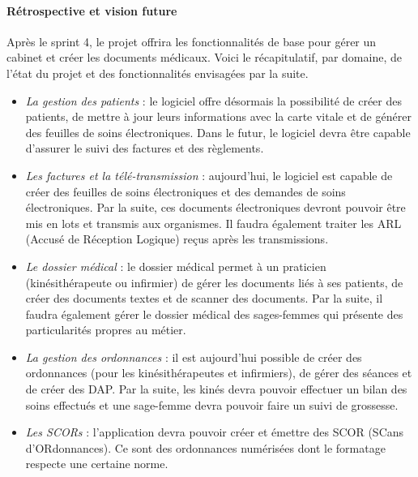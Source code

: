 \paragraph*{Rétrospective et vision future\\}
Après le sprint 4, le projet offrira les fonctionnalités de base pour gérer un cabinet et créer les documents médicaux.
Voici le récapitulatif, par domaine, de l'état du projet et des fonctionnalités envisagées par la suite.
\begin{itemize}
	\item \textit{La gestion des patients} : le logiciel offre désormais la possibilité de créer des patients, de mettre à jour leurs informations avec la carte vitale et de générer des feuilles de soins électroniques.
	Dans le futur, le logiciel devra être capable d'assurer le suivi des factures et des règlements.
	
	\item \textit{Les factures et la télé-transmission} : aujourd'hui, le logiciel est capable de créer des feuilles de soins électroniques et des demandes de soins électroniques. Par la suite, ces documents électroniques devront pouvoir être mis en lots et transmis aux organismes. Il faudra également traiter les \gls{ARL} (Accusé de Réception Logique) reçus après les transmissions.
	
	\item \textit{Le dossier médical} : le dossier médical permet à un praticien (kinésithérapeute ou infirmier) de gérer les documents liés à ses patients, de créer des documents textes et de scanner des documents. Par la suite, il faudra également gérer le dossier médical des sages-femmes qui présente des particularités propres au métier.
	
	\item \textit{La gestion des ordonnances} : il est aujourd'hui possible de créer des ordonnances (pour les kinésithérapeutes et infirmiers), de gérer des séances et de créer des \gls{DAP}. Par la suite, les kinés devra pouvoir effectuer un bilan des soins effectués et une sage-femme devra pouvoir faire un suivi de grossesse.
	
	\item \textit{Les SCORs} : l'application devra pouvoir créer et émettre des \gls{SCOR} (SCans d'ORdonnances). Ce sont des ordonnances numérisées dont le formatage respecte une certaine norme.
\end{itemize} 

